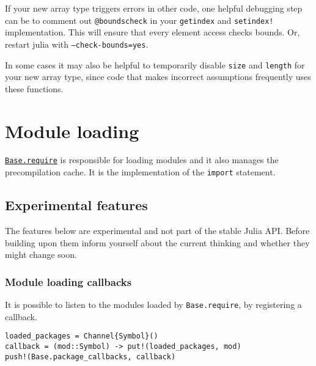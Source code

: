 If your new array type triggers errors in other code, one helpful debugging step can be to comment out \texttt{@boundscheck} in your \texttt{getindex} and \texttt{setindex!} implementation. This will ensure that every element access checks bounds. Or, restart julia with \texttt{--check-bounds=yes}.



In some cases it may also be helpful to temporarily disable \texttt{size} and \texttt{length} for your new array type, since code that makes incorrect assumptions frequently uses these functions.



\hypertarget{860188194179028487}{}


\section{Module loading}



\hyperlink{16690217505788642360}{\texttt{Base.require}} is responsible for loading modules and it also manages the precompilation cache. It is the implementation of the \texttt{import} statement.



\hypertarget{8895570116735182580}{}


\subsection{Experimental features}



The features below are experimental and not part of the stable Julia API. Before building upon them inform yourself about the current thinking and whether they might change soon.



\hypertarget{14149276766401458683}{}


\subsubsection{Module loading callbacks}



It is possible to listen to the modules loaded by \texttt{Base.require}, by registering a callback.




\begin{verbatim}
loaded_packages = Channel{Symbol}()
callback = (mod::Symbol) -> put!(loaded_packages, mod)
push!(Base.package_callbacks, callback)
\end{verbatim}




